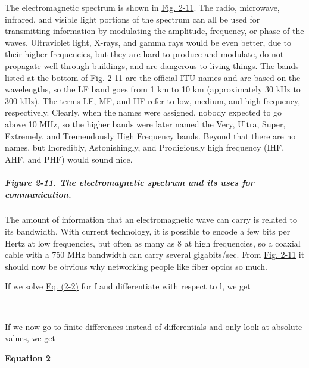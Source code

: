\documentclass[b5paper,11pt]{memoir}
\begin{document}
The electromagnetic spectrum is shown in
\protect\hyperlink{0130661023_ch02lev1sec3.htmlux5cux23ch02fig11}{Fig.
2-11}. The radio, microwave, infrared, and visible light portions of the
spectrum can all be used for transmitting information by modulating the
amplitude, frequency, or phase of the waves. Ultraviolet light, X-rays,
and gamma rays would be even better, due to their higher frequencies,
but they are hard to produce and modulate, do not propagate well through
buildings, and are dangerous to living things. The bands listed at the
bottom of
\protect\hyperlink{0130661023_ch02lev1sec3.htmlux5cux23ch02fig11}{Fig.
2-11} are the official ITU names and are based on the wavelengths, so
the LF band goes from 1 km to 10 km (approximately 30 kHz to 300 kHz).
The terms LF, MF, and HF refer to low, medium, and high frequency,
respectively. Clearly, when the names were assigned, nobody expected to
go above 10 MHz, so the higher bands were later named the Very, Ultra,
Super, Extremely, and Tremendously High Frequency bands. Beyond that
there are no names, but Incredibly, Astonishingly, and Prodigiously high
frequency (IHF, AHF, and PHF) would sound nice.

\subparagraph[Figure 2-11. The electromagnetic spectrum and its uses for
communication.]{\texorpdfstring{\protect\hypertarget{0130661023_ch02lev1sec3.htmlux5cux23ch02fig11}{}{}Figure
2-11. The electromagnetic spectrum and its uses for
communication.}{Figure 2-11. The electromagnetic spectrum and its uses for communication.}}


The amount of information that an electromagnetic wave can carry is
related to its bandwidth. With current technology, it is possible to
encode a few bits per Hertz at low frequencies, but often as many as 8
at high frequencies, so a coaxial cable with a 750 MHz bandwidth can
carry several gigabits/sec. From
\protect\hyperlink{0130661023_ch02lev1sec3.htmlux5cux23ch02fig11}{Fig.
2-11} it should now be obvious why networking people like fiber optics
so much.

If we solve
\protect\hyperlink{0130661023_ch02lev1sec3.htmlux5cux23ch02eq02}{Eq.
(2-2)} for {f} and differentiate with respect to {l}, we get


~

If we now go to finite differences instead of differentials and only
look at absolute values, we get

\textbf{\protect\hypertarget{0130661023_ch02lev1sec3.htmlux5cux23ch02eq03}{}{}
Equation 2}
\end{document}
